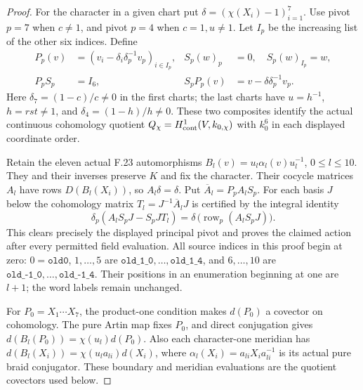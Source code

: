 \begin{proof}
For the character in a given chart put
$\delta=(\chi(X_i)-1)_{i=1}^7$.
Use pivot $p=7$ when $c\ne1$, and pivot $p=4$
when $c=1,u\ne1$. Let $I_p$ be the increasing
list of the other six indices. Define
\[
 \begin{aligned}
 P_p(v)&=(v_i-\delta_i\delta_p^{-1}v_p)_{i\in I_p},
       &S_p(w)_p&=0,\quad S_p(w)_{I_p}=w,\\
 P_pS_p&=I_6,
       &S_pP_p(v)&=v-\delta\delta_p^{-1}v_p.
 \end{aligned}                                                \tag{F.29.6}
\]
Here $\delta_7=(1-c)/c\ne0$ in the first charts;
the last charts have $u=h^{-1}$, $h=rst\ne1$,
and $\delta_4=(1-h)/h\ne0$.
These two composites identify the actual continuous
cohomology quotient $Q_\chi=H^1_{\rm cont}(V,k_{0,\chi})$
with $k_0^6$ in each displayed coordinate order.

Retain the eleven actual F.23 automorphisms
$B_l(v)=u_l\alpha_l(v)u_l^{-1}$, $0\leq l\leq10$.
They and their inverses preserve $K$ and fix
the character. Their cocycle matrices $A_l$
have rows $D(B_l(X_i))$, so $A_l\delta=\delta$.
Put $\overline A_l=P_pA_lS_p$. For each basis
$J$ below the cohomology matrix
$T_l=J^{-1}\overline A_lJ$ is certified by the
integral identity
\[
 \delta_p(A_lS_pJ-S_pJT_l)
             =\delta\,\bigl(\operatorname{row}_p(A_lS_pJ)\bigr).
                                                               \tag{F.29.7}
\]
This clears precisely the displayed principal
pivot and proves the claimed action after every
permitted field evaluation.
All source indices in this proof begin at zero:
$0=\texttt{old0}$, $1,\ldots,5$ are
$\texttt{old\_1\_0},\ldots,\texttt{old\_1\_4}$,
and $6,\ldots,10$ are
$\texttt{old\_-1\_0},\ldots,\texttt{old\_-1\_4}$.
Their positions in an enumeration beginning at
one are $l+1$; the word labels remain unchanged.

For $P_0=X_1\cdots X_7$, the product-one condition
makes $d(P_0)$ a covector on cohomology.
The pure Artin map fixes $P_0$, and direct
conjugation gives $d(B_l(P_0))=\chi(u_l)d(P_0)$.
Also each character-one meridian has
$d(B_l(X_i))=\chi(u_la_{li})d(X_i)$, where
$\alpha_l(X_i)=a_{li}X_ia_{li}^{-1}$ is its
actual pure braid conjugator.
These boundary and meridian evaluations are
the quotient covectors used below.


\end{proof}
